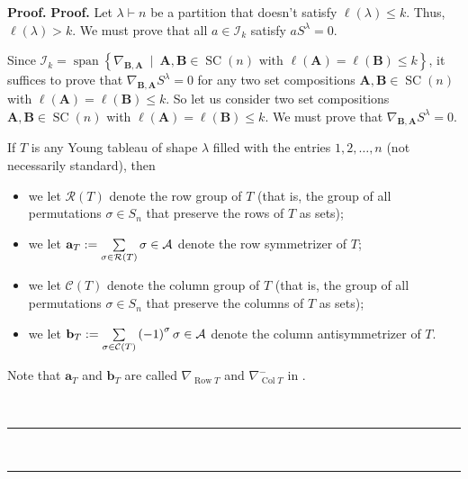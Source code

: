 \documentclass[numbers=enddot,12pt,final,onecolumn,notitlepage]{scrartcl}%
\numberwithin{exer}{subsection}
\theoremstyle{definition}
\newenvironment{proof}[1][Proof]{\noindent\textbf{#1.} }{\ \rule{0.5em}{0.5em}}
\let\sumnonlimits\sum
\renewcommand{\sum}{\sumnonlimits\limits}
\begin{document}
\begin{proof}
\begin{proof}
Let $\lambda\vdash n$ be a partition that doesn't satisfy $\ell\left(
\lambda\right)  \leq k$. Thus, $\ell\left(  \lambda\right)  >k$. We must prove
that all $a\in\mathcal{I}_{k}$ satisfy $aS^{\lambda}=0$.

Since $\mathcal{I}_{k}=\operatorname*{span}\left\{  \nabla_{\mathbf{B}%
,\mathbf{A}}\ \mid\ \mathbf{A},\mathbf{B}\in\operatorname*{SC}\left(
n\right)  \text{ with }\ell\left(  \mathbf{A}\right)  =\ell\left(
\mathbf{B}\right)  \leq k\right\}  $, it suffices to prove that $\nabla
_{\mathbf{B},\mathbf{A}}S^{\lambda}=0$ for any two set compositions
$\mathbf{A},\mathbf{B}\in\operatorname*{SC}\left(  n\right)  $ with
$\ell\left(  \mathbf{A}\right)  =\ell\left(  \mathbf{B}\right)  \leq k$. So
let us consider two set compositions $\mathbf{A},\mathbf{B}\in
\operatorname*{SC}\left(  n\right)  $ with $\ell\left(  \mathbf{A}\right)
=\ell\left(  \mathbf{B}\right)  \leq k$. We must prove that $\nabla
_{\mathbf{B},\mathbf{A}}S^{\lambda}=0$.

If $T$ is any Young tableau of shape $\lambda$ filled with the entries
$1,2,\ldots,n$ (not necessarily standard), then

\begin{itemize}
\item we let $\mathcal{R}\left(  T\right)  $ denote the row group of $T$ (that
is, the group of all permutations $\sigma\in S_{n}$ that preserve the rows of
$T$ as sets);

\item we let $\mathbf{a}_{T}:=\sum\limits_{\sigma\in\mathcal{R}\left(
T\right)  }\sigma\in\mathcal{A}$ denote the row symmetrizer of $T$;

\item we let $\mathcal{C}\left(  T\right)  $ denote the column group of $T$
(that is, the group of all permutations $\sigma\in S_{n}$ that preserve the
columns of $T$ as sets);

\item we let $\mathbf{b}_{T}:=\sum\limits_{\sigma\in\mathcal{C}\left(
T\right)  }\left(  -1\right)  ^{\sigma}\sigma\in\mathcal{A}$ denote the column
antisymmetrizer of $T$.
\end{itemize}

Note that $\mathbf{a}_{T}$ and $\mathbf{b}_{T}$ are called $\nabla
_{\operatorname*{Row}T}$ and $\nabla_{\operatorname*{Col}T}^{-}$ in
\cite[\S 5.5.1]{sga}.


\end{proof}
\end{proof}
\end{document}
